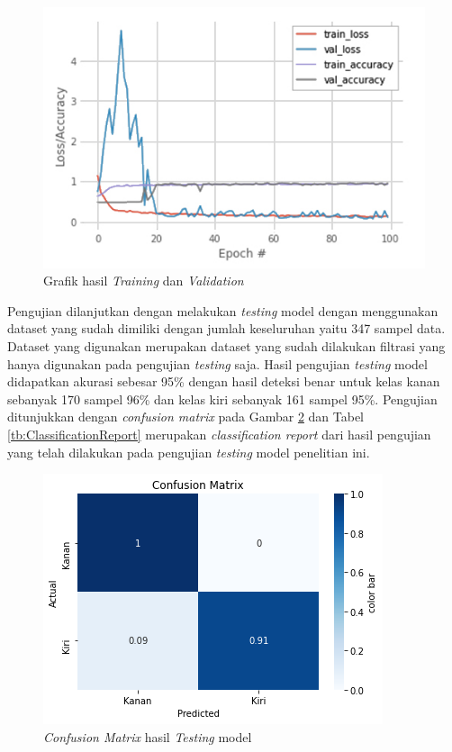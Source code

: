 \begin{figure}[H]
  \centering
  \includegraphics[scale=0.6]{gambar/hasil training dan validation w.jpg}
  \caption{Grafik hasil \emph{Training} dan \emph{Validation}}
  \label{fig:HasilTrainingValidation}
\end{figure}

Pengujian dilanjutkan dengan melakukan \emph{testing} model dengan menggunakan dataset yang sudah dimiliki dengan jumlah keseluruhan yaitu 347 sampel data. Dataset yang digunakan merupakan dataset yang sudah dilakukan filtrasi yang hanya digunakan pada pengujian \emph{testing} saja. Hasil pengujian \emph{testing} model didapatkan akurasi sebesar 95\% dengan hasil deteksi benar untuk kelas kanan sebanyak 170 sampel 96\% dan kelas kiri sebanyak 161 sampel 95\%. Pengujian ditunjukkan dengan \emph{confusion matrix} pada Gambar \ref{fig:HasilTesting} dan Tabel \ref{tb:ClassificationReport} merupakan \emph{classification report} dari hasil pengujian yang telah dilakukan pada pengujian \emph{testing} model penelitian ini.

\begin{figure}[H]
  \centering
  \includegraphics[scale=0.9]{gambar/cm normalized.png}
  \caption{\emph{Confusion Matrix} hasil \emph{Testing} model}
  \label{fig:HasilTesting}
\end{figure}

